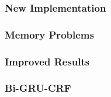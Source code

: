         \subsubsection{New Implementation}
        \subsubsection{Memory Problems}
        \subsubsection{Improved Results}
        \subsubsection{Bi-GRU-CRF}